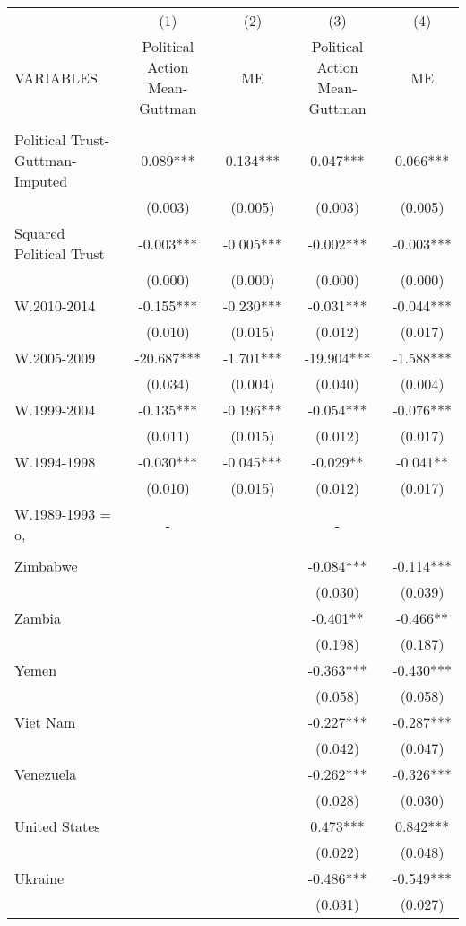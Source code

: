 \documentclass[]{article}
\begin{document}
\begin{tabular}{lcccc} \hline
 & (1) & (2) & (3) & (4) \\
VARIABLES & Political Action Mean-Guttman & ME & Political Action Mean-Guttman & ME \\ \hline
 &  &  &  &  \\
Political Trust-Guttman-Imputed & 0.089*** & 0.134*** & 0.047*** & 0.066*** \\
 & (0.003) & (0.005) & (0.003) & (0.005) \\
Squared Political Trust & -0.003*** & -0.005*** & -0.002*** & -0.003*** \\
 & (0.000) & (0.000) & (0.000) & (0.000) \\
W.2010-2014 & -0.155*** & -0.230*** & -0.031*** & -0.044*** \\
 & (0.010) & (0.015) & (0.012) & (0.017) \\
W.2005-2009 & -20.687*** & -1.701*** & -19.904*** & -1.588*** \\
 & (0.034) & (0.004) & (0.040) & (0.004) \\
W.1999-2004 & -0.135*** & -0.196*** & -0.054*** & -0.076*** \\
 & (0.011) & (0.015) & (0.012) & (0.017) \\
W.1994-1998 & -0.030*** & -0.045*** & -0.029** & -0.041** \\
 & (0.010) & (0.015) & (0.012) & (0.017) \\
W.1989-1993 = o, & - &  & - &  \\
 &  &  &  &  \\
Zimbabwe &  &  & -0.084*** & -0.114*** \\
 &  &  & (0.030) & (0.039) \\
Zambia &  &  & -0.401** & -0.466** \\
 &  &  & (0.198) & (0.187) \\
Yemen &  &  & -0.363*** & -0.430*** \\
 &  &  & (0.058) & (0.058) \\
Viet Nam &  &  & -0.227*** & -0.287*** \\
 &  &  & (0.042) & (0.047) \\
Venezuela &  &  & -0.262*** & -0.326*** \\
 &  &  & (0.028) & (0.030) \\
United States &  &  & 0.473*** & 0.842*** \\
 &  &  & (0.022) & (0.048) \\
Ukraine &  &  & -0.486*** & -0.549*** \\
 &  &  & (0.031) & (0.027) \\

\end{tabular}
\end{document}
